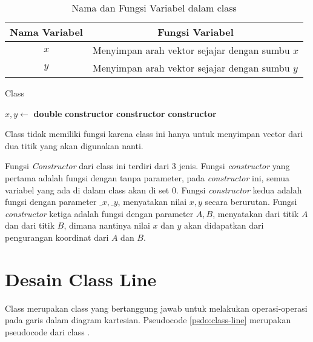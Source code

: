 \begin{table}[]
	\Centering
	\begin{tabular}{|c|p{7cm}|}
	\hline
	Nama Variabel & \multicolumn{1}{c|}{Fungsi Variabel}                               \\ \hline
$x$           & Menyimpan arah vektor sejajar dengan sumbu $x$  \\ \hline
$y$           & Menyimpan arah vektor sejajar dengan sumbu $y$          \\ \hline
	\end{tabular}
	\caption{Nama dan Fungsi Variabel dalam class }
	\label{tab:var-vec}
\end{table}
\begin{algorithm}
	\caption{Class }
	\label{psdo:class-vec}
	\begin{algorithmic}[1]
        \State $ x, y \leftarrow $ \textbf{double}
		\State \textbf{constructor} 
        \State \textbf{constructor} 
        \State \textbf{constructor} 
	\end{algorithmic}
\end{algorithm}

Class  tidak memiliki fungsi karena class ini hanya untuk menyimpan vector dari dua titik yang akan digunakan nanti.

Fungsi \textit{Constructor} dari class ini terdiri dari 3 jenis. Fungsi \textit{constructor} yang pertama adalah fungsi dengan tanpa parameter, pada \textit{constructor} ini, semua variabel yang ada di dalam class  akan di set $0$. Fungsi \textit{constructor} kedua adalah fungsi dengan parameter $\_x, \_y$, menyatakan nilai $x, y$ secara berurutan. Fungsi \textit{constructor} ketiga adalah fungsi dengan parameter $A, B$, menyatakan  dari titik $A$ dan  dari titik $B$, dimana nantinya nilai $x$ dan $y$ akan didapatkan dari pengurangan koordinat dari  $A$ dan  $B$.

\section{Desain Class Line}
Class  merupakan class yang bertanggung jawab untuk melakukan operasi-operasi pada garis dalam diagram kartesian. Pseudocode \ref{psdo:class-line} merupakan pseudocode dari class . 

